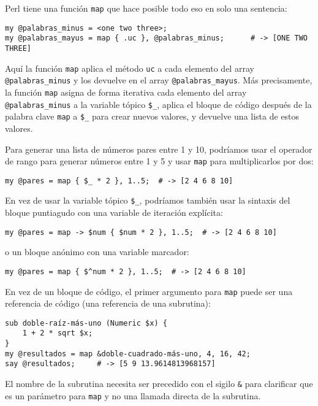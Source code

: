 Perl tiene una función {\tt map} que hace posible todo eso
en solo una sentencia:

\begin{lstlisting}
my @palabras_minus = <one two three>;
my @palabras_mayus = map { .uc }, @palabras_minus;      # -> [ONE TWO THREE]
\end{lstlisting}
%

Aquí la función {\tt map} aplica el método {\tt uc} a cada
elemento del array \verb|@palabras_minus| y los devuelve
en el array \verb|@palabras_mayus|. Más precisamente, 
la función {\tt map} asigna de forma iterativa cada elemento
del array \verb|@palabras_minus| a la variable tópico \verb|$_|,
aplica el bloque de código después de la palabra clave {\tt map}
a \verb|$_| para crear nuevos valores, y devuelve una lista de estos
valores.

Para generar una lista de números pares entre 1 y 10, podríamos
usar el operador de rango para generar números entre 1 y 5
y usar {\tt map} para multiplicarlos por dos:

\begin{lstlisting}
my @pares = map { $_ * 2 }, 1..5;  # -> [2 4 6 8 10]
\end{lstlisting}
%

En vez de usar la variable tópico \verb|$_|, podríamos también
usar la sintaxis del bloque puntiagudo con una variable de 
iteración explícita:

\begin{lstlisting}
my @pares = map -> $num { $num * 2 }, 1..5;  # -> [2 4 6 8 10]
\end{lstlisting}
%

o un bloque anónimo con una variable marcador:

\begin{lstlisting}
my @pares = map { $^num * 2 }, 1..5;  # -> [2 4 6 8 10]
\end{lstlisting}
%

En vez de un bloque de código, el primer argumento para {\tt map}
puede ser una referencia de código (una referencia de una
subrutina):

\begin{lstlisting}
sub doble-raíz-más-uno (Numeric $x) { 
    1 + 2 * sqrt $x;
}
my @resultados = map &doble-cuadrado-más-uno, 4, 16, 42;
say @resultados;     # -> [5 9 13.9614813968157]
\end{lstlisting}
%

El nombre de la subrutina necesita ser precedido con el 
sigilo {\tt \&} para clarificar que es un parámetro para 
{\tt map} y no una llamada directa de la subrutina.

